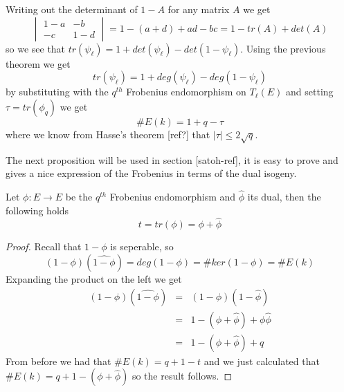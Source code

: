 Writing out the determinant of $1-A$ for any matrix $A$ we get
$$ \begin{vmatrix} 1-a & -b \\ -c & 1-d \end{vmatrix} = 1-(a+d)+ad-bc = 1-tr(A)+det(A) $$
so we see that $tr(\psi_\ell) = 1 + det(\psi_\ell) - det(1-\psi_\ell)$. Using the previous theorem we
get $$tr(\psi_\ell) = 1 + deg(\psi_\ell) - deg(1-\psi_\ell)$$ by substituting with the $q^{th}$ 
Frobenius endomorphism on $T_\ell(E)$ and setting $\tau = tr(\phi_q)$ we get
$$\#E(k) = 1 + q - \tau$$
where we know from Hasse's theorem [ref?] that $|\tau| \leq 2\sqrt{q}$.


The next proposition will be used in section [satoh-ref], it is easy to prove and gives a nice
expression of the Frobenius in terms of the dual isogeny.

\begin{prop}
 Let $\phi: E \rightarrow E$ be the $q^{th}$ Frobenius endomorphism and $\widehat{\phi}$ its dual, then
the following holds
$$ t = tr(\phi) = \phi + \widehat{\phi}$$
\end{prop}
\begin{proof}
 Recall that $1-\phi$ is seperable, so $$(1-\phi)(\widehat{1-\phi}) = deg(1-\phi) = \#ker(1-\phi) = \#E(k)$$
Expanding the product on the left we get
\begin{eqnarray}
 (1-\phi)(\widehat{1-\phi}) &=& (1-\phi)(1-\widehat{\phi}) \nonumber \\
			    &=& 1 - (\phi + \widehat{\phi}) + \phi\widehat{\phi} \nonumber \\
			    &=& 1 - (\phi + \widehat{\phi}) + q \nonumber
\end{eqnarray}
From before we had that $\#E(k) = q + 1 - t$ and we just calculated that $\#E(k) = q + 1 - (\phi +\widehat{\phi})$ so
the result follows.
\end{proof}

